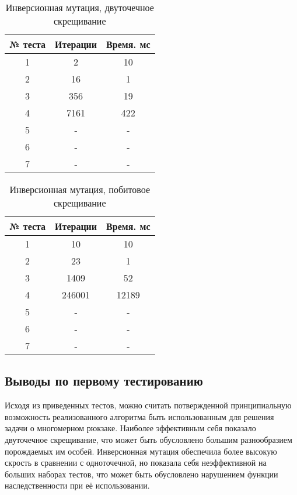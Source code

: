 \begin{table}[ht]
\centering
\begin{tabular}{|c|c|c|}
\hline
№ теста & Итерации & Время. мс \\ \hline
1       & 2        & 10        \\ \hline
2       & 16       & 1         \\ \hline
3       & 356      & 19        \\ \hline
4       & 7161     & 422       \\ \hline
5       & -        & -         \\ \hline
6       & -        & -         \\ \hline
7       & -        & -         \\ \hline
\end{tabular}
\caption{Инверсионная мутация, двуточечное скрещивание}
\label{InvMutDoubleCross}
\end{table}

\begin{table}[ht]
\centering
\begin{tabular}{|c|c|c|}
\hline
№ теста & Итерации & Время. мс \\ \hline
1       & 10       & 10        \\ \hline
2       & 23       & 1         \\ \hline
3       & 1409     & 52        \\ \hline
4       & 246001   & 12189     \\ \hline
5       & -        & -         \\ \hline
6       & -        & -         \\ \hline
7       & -        & -         \\ \hline
\end{tabular}
\caption{Инверсионная мутация, побитовое скрещивание}
\label{InvMutBitCross}
\end{table}
\FloatBarrier
\subsection{Выводы по первому тестированию}
Исходя из приведенных тестов, можно считать потвержденной принципиальную возможность реализованного алгоритма быть использованным для решения задачи о многомерном рюкзаке. Наиболее эффективным себя показало двуточечное скрещивание, что может быть обусловлено большим разнообразием порождаемых им особей. Инверсионная мутация обеспечила более высокую скрость в сравнении с одноточечной, но показала себя неэффективной на больших наборах тестов, что может быть обусловлено нарушением функции наследственности при её использовании. 

